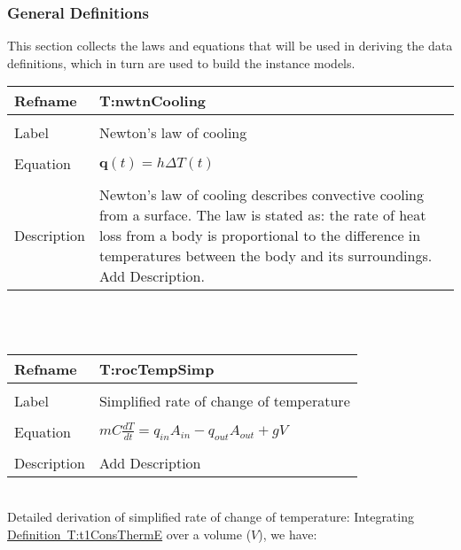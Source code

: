 \documentclass[12pt]{article}
\begin{document}
\subsubsection{General Definitions}
\label{Sec:GeneDefi}
This section collects the laws and equations that will be used in deriving the data definitions, which in turn are used to build the instance models.
~\newline
\noindent \begin{minipage}{\textwidth}
\begin{tabular}{p{} p{}}
\toprule \textbf{Refname} & \textbf{T:nwtnCooling}
\label{T:nwtnCooling}
\\ \midrule \\
Label & Newton's law of cooling
\\ \midrule \\
Equation & $\mathbf{q}\left(t\right)=h\Delta{}T\left(t\right)$
\\ \midrule \\
Description & Newton's law of cooling describes convective cooling from a surface. The law is stated as: the rate of heat loss from a body is proportional to the difference in temperatures between the body and its surroundings. Add Description.
\\ \bottomrule \end{tabular}
\end{minipage}\\
~\newline
\noindent \begin{minipage}{\textwidth}
\begin{tabular}{p{} p{}}
\toprule \textbf{Refname} & \textbf{T:rocTempSimp}
\label{T:rocTempSimp}
\\ \midrule \\
Label & Simplified rate of change of temperature
\\ \midrule \\
Equation & $mC\frac{dT}{dt}=q_{in}A_{in}-q_{out}A_{out}+gV$
\\ \midrule \\
Description & Add Description
\\ \bottomrule \end{tabular}
\end{minipage}\\
Detailed derivation of simplified rate of change of temperature:
Integrating \hyperref[T:t1ConsThermE]{Definition~T:t1ConsThermE} over a volume ($V$), we have:
\end{document}
